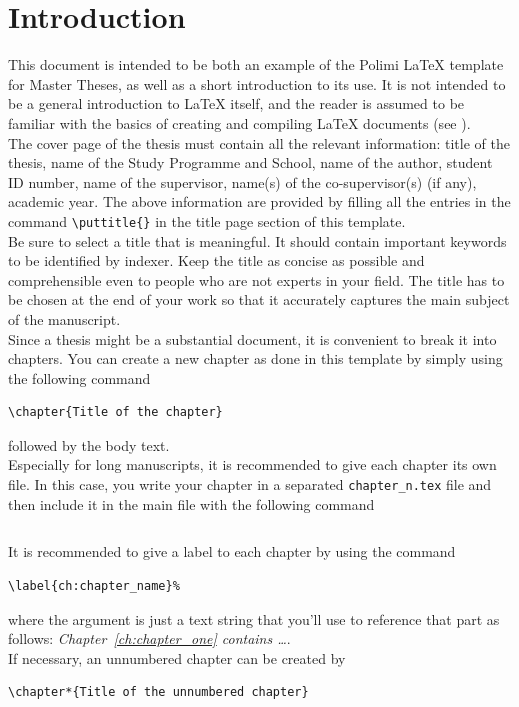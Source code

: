 \chapter*{Introduction}

This document is intended to be both an example of the Polimi \LaTeX{} template for Master Theses,
as well as a short introduction to its use. It is not intended to be a general introduction to \LaTeX{} itself,
and the reader is assumed to be familiar with the basics of creating and compiling \LaTeX{} documents (see \cite{oetiker1995not, kottwitz2015latex}). 
\\
The cover page of the thesis must contain all the relevant information:
title of the thesis, name of the Study Programme and School, name of the author,
student ID number, name of the supervisor, name(s) of the co-supervisor(s) (if any), academic year.
The above information are provided by filling all the entries in the command \verb|\puttitle{}|
in the title page section of this template.
\\
Be sure to select a title that is meaningful.
It should contain important keywords to be identified by indexer.
Keep the title as concise as possible and comprehensible even to people who are not experts in your field.
The title has to be chosen at the end of your work so that it accurately captures the main subject of the manuscript. 
\\
Since a thesis might be a substantial document, it is convenient to break it into chapters.
You can create a new chapter as done in this template by simply using the following command
\begin{verbatim}
\chapter{Title of the chapter}
\end{verbatim}
followed by the body text.
\\
Especially for long manuscripts, it is recommended to give each chapter its own file.
In this case, you write your chapter in a separated \verb|chapter_n.tex| file
and then include it in the main file with the following command
\begin{verbatim}

\end{verbatim}
It is recommended to give a label to each chapter by using the command
\begin{verbatim}
\label{ch:chapter_name}%
\end{verbatim}
where the argument is just a text string that you'll use to reference that part
as follows: \textit{Chapter~\ref{ch:chapter_one} contains   \dots}.\\
If necessary, an unnumbered chapter can be created by
\begin{verbatim}
\chapter*{Title of the unnumbered chapter}
\end{verbatim}

